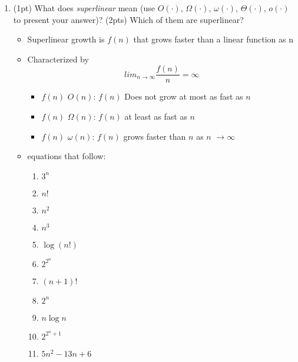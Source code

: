 \documentclass{article}[12pt]
\newcommand\encircle[1]{\raisebox{.5pt}{\textcircled{\raisebox{-.9pt} {\footnotesize #1}}} }
\begin{document}
\begin{enumerate}[label=(\arabic*)]
  \item (1pt) What does \emph{superlinear} mean (use $O(\cdot)$, $\Omega(\cdot)$, $\omega(\cdot)$, $\Theta(\cdot)$, $o(\cdot)$ to present your answer)? (2pts) Which of them are superlinear?
    \begin{itemize}
      \item Superlinear growth is $f(n)$ that grows faster than a linear function as n \rightarrow \infty
      \item Characterized by
        \begin{equation}
          lim_{n \rightarrow \infty} \frac{f(n)}{n} = \infty
        \end{equation}
        \begin{itemize}
          \item $f(n)$ \epsilon $O(n)$: $f(n)$ Does not grow at most as fast as $n$
          \item $f(n)$ \epsilon $\Omega(n)$: $f(n)$ at least as fast as $n$
          \item $f(n)$ \epsilon $\omega(n)$: $f(n)$ grows faster than $n$ as $n$ $\rightarrow \infty$
        \end{itemize}
      \item equations that follow:
\begin{center}
\begin{multicols}{4}
\begin{enumerate}[label=\encircle{\arabic*}]
  \item $3^n$
  \item $n!$
  \item $n^2$
  \item $n^3$
  \item $\log(n!)$
  \item $2^{2^n}$
  \item $(n+1)!$
  \item $2^n$
  \item $n\log n$
  \item $2^{2^n+1}$
  \item $5n^2-13n+6$
\end{enumerate}
\end{multicols}
\end{center}
    \end{itemize}


\end{enumerate}
\end{document}
